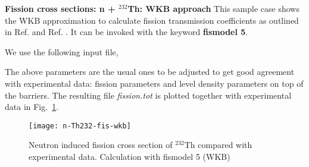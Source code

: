 \begin{samplecase}
{\bf Fission cross sections: n + ${}^{232}$Th: WKB approach}\newline
This sample case shows the
WKB approximation to calculate fission transmission coefficients as outlined in
Ref. \cite{Sin2006} and Ref. \cite{Goriely2011}. It can be invoked
with the keyword {\bf fismodel 5}.

We use the following input file,


The above parameters are the usual ones to be adjusted to get good
agreement with experimental data: fission parameters and level density parameters
on top of the barriers.
The resulting file {\em fission.tot} is plotted
together with experimental data in Fig.~\ref{fissioneps-wkb}.

\end{samplecase}
\begin{figure}
\centering\texttt{[image: n-Th232-fis-wkb]}
\caption{Neutron induced fission cross section of ${}^{232}$Th compared with
experimental data. Calculation with fismodel 5 (WKB)}
\label{fissioneps-wkb}
\end{figure}

